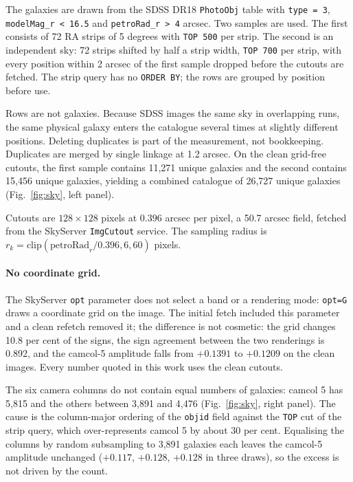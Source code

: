 \documentclass[linenumbers]{aa}
\begin{document}
The galaxies are drawn from the SDSS DR18 \texttt{PhotoObj} table with \texttt{type = 3},
\texttt{modelMag\_r < 16.5} and \texttt{petroRad\_r > 4} arcsec. Two samples are used. The first
consists of 72 RA strips of 5 degrees with \texttt{TOP 500} per strip. The second is an independent
sky: 72 strips shifted by half a strip width, \texttt{TOP 700} per strip, with every position
within 2 arcsec of the first sample dropped before the cutouts are fetched. The strip query has no
\texttt{ORDER BY}; the rows are grouped by position before use.

Rows are not galaxies. Because SDSS images the same sky in overlapping runs, the same physical
galaxy enters the catalogue several times at slightly different positions. Deleting duplicates is
part of the measurement, not bookkeeping. Duplicates are merged by single linkage at 1.2 arcsec. On
the clean grid-free cutouts, the first sample contains 11,271 unique galaxies and the second
contains 15,456 unique galaxies, yielding a combined catalogue of 26,727 unique galaxies
(Fig.~\ref{fig:sky}, left panel).

Cutouts are $128 \times 128$ pixels at $0.396$ arcsec per pixel, a 50.7 arcsec field, fetched from
the SkyServer \texttt{ImgCutout} service. The sampling radius is
$r_k = \mathrm{clip}(\mathrm{petroRad}_r/0.396, 6, 60)$ pixels.

\paragraph{No coordinate grid.} The SkyServer \texttt{opt} parameter does not select a band or a
rendering mode: \texttt{opt=G} draws a coordinate grid on the image. The initial fetch included
this parameter and a clean refetch removed it; the difference is not cosmetic: the grid changes
10.8 per cent of the signs, the sign agreement between the two renderings is 0.892, and the
camcol-5 amplitude falls from $+0.1391$ to $+0.1209$ on the clean images. Every number quoted in
this work uses the clean cutouts.

The six camera columns do not contain equal numbers of galaxies: camcol 5 has 5,815 and the others
between 3,891 and 4,476 (Fig.~\ref{fig:sky}, right panel). The cause is the column-major ordering
of the \texttt{objid} field against the \texttt{TOP} cut of the strip query, which over-represents
camcol 5 by about 30 per cent. Equalising the columns by random subsampling to 3,891 galaxies each
leaves the camcol-5 amplitude unchanged ($+0.117$, $+0.128$, $+0.128$ in three draws), so the
excess is not driven by the count.
\end{document}
